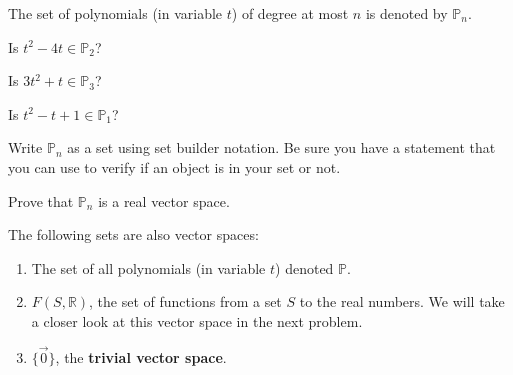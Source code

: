 \bq\label{vse} The set of polynomials (in variable $t$) of degree at most $n$ is denoted by $\mathbb{P}_n$.
\be
\item Is $t^2-4t \in \mathbb{P}_2$?
\item Is $3t^2+t \in \mathbb{P}_3$?
\item Is $t^2-t+1 \in \mathbb{P}_1$?
\item Write $\mathbb{P}_n$ as a set using set builder notation. Be sure you have a statement that you can use to verify if an object is in your set or not.
\item Prove that $\mathbb{P}_n$ is a real vector space.
\begin{annotation}
\end{annotation}
\ee
\eq
\begin{example}
The following sets are also vector spaces:
\begin{enumerate}
\item The set of all polynomials (in variable $t$) denoted $\mathbb{P}$.
\item $F(S,\mathbb{R})$, the set of functions from a set $S$ to the real numbers. We will take a closer look at this vector space in the next problem.
\item $\{\vec{0}\}$, the \textbf{trivial vector space}.
\end{enumerate}
\end{example}


